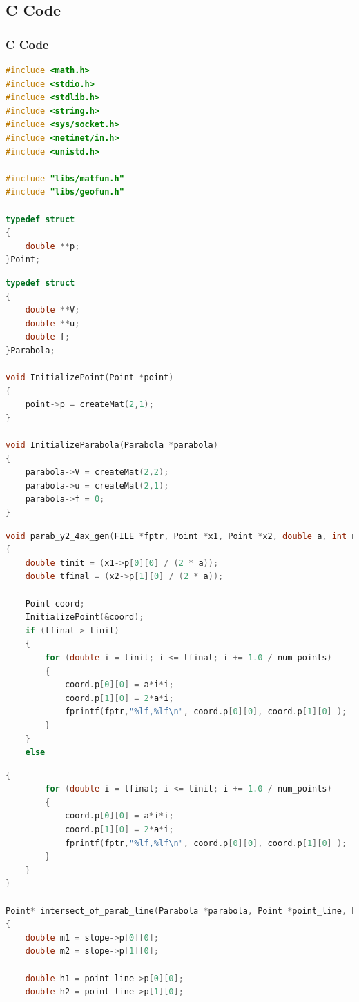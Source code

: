 \documentclass{beamer}
\theoremstyle{remark}
\numberwithin{equation}{section}
\begin{document}
\subsection{C Code}
\begin{frame}[fragile]
\frametitle{C Code}
\begin{lstlisting}[language=C]
#include <math.h>
#include <stdio.h>
#include <stdlib.h>
#include <string.h>
#include <sys/socket.h>
#include <netinet/in.h>
#include <unistd.h>

#include "libs/matfun.h"
#include "libs/geofun.h"

typedef struct 
{
    double **p;
}Point;

\end{lstlisting}
 \end{frame}
 \begin{frame}[fragile]
 \begin{lstlisting}[language = C]
 typedef struct 
{
    double **V;
    double **u;
    double f;
}Parabola;

void InitializePoint(Point *point)
{
    point->p = createMat(2,1);
}

void InitializeParabola(Parabola *parabola)
{
    parabola->V = createMat(2,2);
    parabola->u = createMat(2,1);
    parabola->f = 0;
}
 \end{lstlisting}
 \end{frame}
  \begin{frame}[fragile]
 \begin{lstlisting}[language = C]
void parab_y2_4ax_gen(FILE *fptr, Point *x1, Point *x2, double a, int num_points) 
{
    double tinit = (x1->p[0][0] / (2 * a));
    double tfinal = (x2->p[1][0] / (2 * a));

    Point coord;
    InitializePoint(&coord);
    if (tfinal > tinit)
    {
        for (double i = tinit; i <= tfinal; i += 1.0 / num_points) 
        {
            coord.p[0][0] = a*i*i;
            coord.p[1][0] = 2*a*i;
            fprintf(fptr,"%lf,%lf\n", coord.p[0][0], coord.p[1][0] );
        }
    }
    else
\end{lstlisting}
\end{frame}
\begin{frame}[fragile]
 \begin{lstlisting}[language = C]
 {
        for (double i = tfinal; i <= tinit; i += 1.0 / num_points)
        {
            coord.p[0][0] = a*i*i;
            coord.p[1][0] = 2*a*i;
            fprintf(fptr,"%lf,%lf\n", coord.p[0][0], coord.p[1][0] );
        }
    }
}

Point* intersect_of_parab_line(Parabola *parabola, Point *point_line, Point *slope)
{
    double m1 = slope->p[0][0];
    double m2 = slope->p[1][0];

    double h1 = point_line->p[0][0];
    double h2 = point_line->p[1][0];
\end{lstlisting}
\end{frame}
\end{document}
